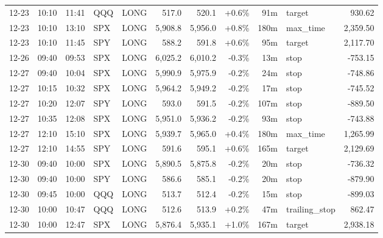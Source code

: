 \documentclass[11pt,a4paper,twoside]{article}
\begin{document}
\begin{center}
\begin{longtable}{>{\color{txtmain}}l l l l l r r r r >{\color{txtmain}}l r}
12-23 & 10:10 & 11:41 & QQQ & LONG & 517.0 & 520.1 & \textcolor{wingreen}{+0.6\%} & 91m & target & \textcolor{wingreen}{930.62} \\
12-23 & 10:10 & 13:10 & SPX & LONG & 5,908.8 & 5,956.0 & \textcolor{wingreen}{+0.8\%} & 180m & max\_time & \textcolor{wingreen}{2,359.50} \\
12-23 & 10:10 & 11:45 & SPY & LONG & 588.2 & 591.8 & \textcolor{wingreen}{+0.6\%} & 95m & target & \textcolor{wingreen}{2,117.70} \\
12-26 & 09:40 & 09:53 & SPX & LONG & 6,025.2 & 6,010.2 & \textcolor{lossred}{-0.3\%} & 13m & stop & \textcolor{lossred}{-753.15} \\
12-27 & 09:40 & 10:04 & SPX & LONG & 5,990.9 & 5,975.9 & \textcolor{lossred}{-0.2\%} & 24m & stop & \textcolor{lossred}{-748.86} \\
12-27 & 10:15 & 10:32 & SPX & LONG & 5,964.2 & 5,949.2 & \textcolor{lossred}{-0.2\%} & 17m & stop & \textcolor{lossred}{-745.52} \\
12-27 & 10:20 & 12:07 & SPY & LONG & 593.0 & 591.5 & \textcolor{lossred}{-0.2\%} & 107m & stop & \textcolor{lossred}{-889.50} \\
12-27 & 10:35 & 12:08 & SPX & LONG & 5,951.0 & 5,936.2 & \textcolor{lossred}{-0.2\%} & 93m & stop & \textcolor{lossred}{-743.88} \\
12-27 & 12:10 & 15:10 & SPX & LONG & 5,939.7 & 5,965.0 & \textcolor{wingreen}{+0.4\%} & 180m & max\_time & \textcolor{wingreen}{1,265.99} \\
12-27 & 12:10 & 14:55 & SPY & LONG & 591.6 & 595.1 & \textcolor{wingreen}{+0.6\%} & 165m & target & \textcolor{wingreen}{2,129.69} \\
12-30 & 09:40 & 10:00 & SPX & LONG & 5,890.5 & 5,875.8 & \textcolor{lossred}{-0.2\%} & 20m & stop & \textcolor{lossred}{-736.32} \\
12-30 & 09:40 & 10:00 & SPY & LONG & 586.6 & 585.1 & \textcolor{lossred}{-0.2\%} & 20m & stop & \textcolor{lossred}{-879.90} \\
12-30 & 09:45 & 10:00 & QQQ & LONG & 513.7 & 512.4 & \textcolor{lossred}{-0.2\%} & 15m & stop & \textcolor{lossred}{-899.03} \\
12-30 & 10:00 & 10:47 & QQQ & LONG & 512.6 & 513.9 & \textcolor{wingreen}{+0.2\%} & 47m & trailing\_stop & \textcolor{wingreen}{862.47} \\
12-30 & 10:00 & 12:47 & SPX & LONG & 5,876.4 & 5,935.1 & \textcolor{wingreen}{+1.0\%} & 167m & target & \textcolor{wingreen}{2,938.18} \\

\end{longtable}
\end{center}
\end{document}
